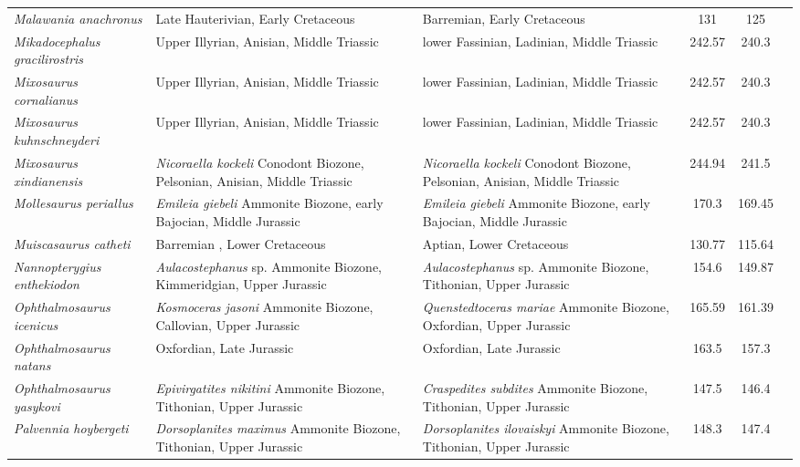 \begin{longtabu}{>{\itshape}lXXSSl}
	Malawania anachronus & Late Hauterivian, Early Cretaceous & Barremian, Early Cretaceous & 131 & 125 & \cite{Fischer2013a} \\
	Mikadocephalus gracilirostris & Upper Illyrian, Anisian, Middle Triassic & lower Fassinian, Ladinian, Middle Triassic & 242.57 & 240.3 & \cite{Maisch1997c} \\
	Mixosaurus cornalianus & Upper Illyrian, Anisian, Middle Triassic & lower Fassinian, Ladinian, Middle Triassic & 242.57 & 240.3 & \cite{Repossi1902,McGowan2003} \\
	Mixosaurus kuhnschneyderi & Upper Illyrian, Anisian, Middle Triassic & lower Fassinian, Ladinian, Middle Triassic & 242.57 & 240.3 & \cite{Brinkmann1998} \\
	Mixosaurus xindianensis & \emph{Nicoraella kockeli} Conodont Biozone, Pelsonian, Anisian, Middle Triassic & \emph{Nicoraella kockeli} Conodont Biozone, Pelsonian, Anisian, Middle Triassic & 244.94 & 241.5 & \cite{Chen2010} \\
	Mollesaurus periallus & \emph{Emileia giebeli} Ammonite Biozone, early Bajocian, Middle Jurassic & \emph{Emileia giebeli} Ammonite Biozone, early Bajocian, Middle Jurassic & 170.3 & 169.45 & \cite{Fernandez2014,Fernandez1999} \\
	Muiscasaurus catheti & Barremian , Lower Cretaceous & Aptian, Lower Cretaceous & 130.77 & 115.64 & \cite{Maxwell2016} \\
	Nannopterygius enthekiodon & \emph{Aulacostephanus} sp. Ammonite Biozone, Kimmeridgian, Upper Jurassic & \emph{Aulacostephanus} sp. Ammonite Biozone, Tithonian, Upper Jurassic & 154.6 & 149.87 & \cite{Moon2018} \\
	Ophthalmosaurus icenicus & \emph{Kosmoceras jasoni} Ammonite Biozone, Callovian, Upper Jurassic & \emph{Quenstedtoceras mariae} Ammonite Biozone, Oxfordian, Upper Jurassic & 165.59 & 161.39 & \cite{Moon2016} \\
	Ophthalmosaurus natans & Oxfordian, Late Jurassic & Oxfordian, Late Jurassic & 163.5 & 157.3 & \cite{Gilmore1905} \\
	Ophthalmosaurus yasykovi & \emph{Epivirgatites nikitini} Ammonite Biozone, Tithonian, Upper Jurassic & \emph{Craspedites subdites} Ammonite Biozone, Tithonian, Upper Jurassic & 147.5 & 146.4 & \cite{Efimov1999} \\
	Palvennia hoybergeti & \emph{Dorsoplanites maximus} Ammonite Biozone, Tithonian, Upper Jurassic & \emph{Dorsoplanites ilovaiskyi} Ammonite Biozone, Tithonian, Upper Jurassic & 148.3 & 147.4 & \cite{Druckenmiller2012a} \\

\end{longtabu}
